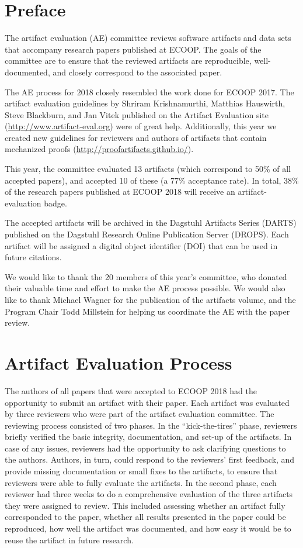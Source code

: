 \documentclass[a4paper,UKenglish]{dartsmaster}
\begin{document}
\chapter{Preface} %

The artifact evaluation (AE) committee reviews software artifacts and data sets that accompany research papers published at ECOOP. The goals of the committee are to ensure that the reviewed artifacts are reproducible, well-documented, and closely correspond to the associated paper. 

The AE process for 2018 closely resembled the work done for ECOOP 2017. The artifact evaluation guidelines by Shriram Krishnamurthi, Matthias
Hauswirth, Steve Blackburn, and Jan Vitek published on the Artifact
Evaluation site (\url{http://www.artifact-eval.org}) were of great help. Additionally, this year we created new guidelines for reviewers and authors of artifacts that contain mechanized proofs (\url{http://proofartifacts.github.io/}). 

This year, the committee evaluated 13 artifacts (which correspond to 50\% of all
accepted papers), and accepted 10 of these (a 77\% acceptance rate). In total, 38\% of the research papers published at ECOOP 2018 will receive an artifact-evaluation badge.

The accepted artifacts will be archived in the Dagstuhl Artifacts Series (DARTS) published on the Dagstuhl Research Online Publication Server (DROPS). Each artifact will be assigned a digital object identifier (DOI) that can be used in future citations. 

We would like to thank the 20 members of this year's committee, who donated their valuable time and effort to make the AE process possible. We would also like to thank  Michael Wagner for the publication of the artifacts volume, and the Program Chair Todd Millstein for helping us coordinate the AE with the paper review.

\chapter{Artifact Evaluation Process}
The authors of all papers that were accepted to ECOOP 2018 had the opportunity to submit an artifact with their paper.
Each artifact was evaluated by three reviewers who were part of the artifact evaluation committee. 
The reviewing process consisted of two phases.
In the ``kick-the-tires'' phase, reviewers briefly verified the basic integrity, documentation, and set-up of the artifacts.
In case of any issues, reviewers had the opportunity to ask clarifying questions to the authors.
Authors, in turn, could respond to the reviewers' first feedback, and provide missing documentation
or small fixes to the artifacts, to ensure that reviewers were able to fully evaluate the artifacts.
In the second phase, each reviewer had three weeks to do a comprehensive evaluation of the three artifacts they were
assigned to review. This included assessing whether an artifact fully corresponded to the paper,
whether all results presented in the paper could be reproduced, how well the artifact was documented,
and how easy it would be to reuse the artifact in future research.
\end{document}
